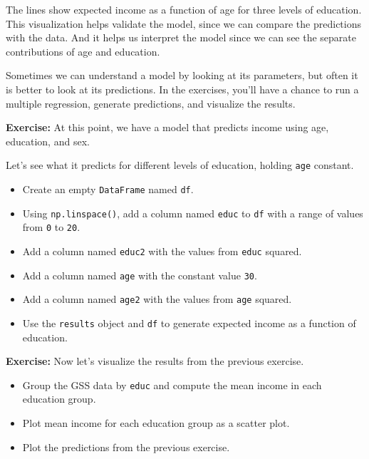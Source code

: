 The lines show expected income as a function of age for three levels of
education. This visualization helps validate the model, since we can
compare the predictions with the data. And it helps us interpret the
model since we can see the separate contributions of age and education.

Sometimes we can understand a model by looking at its parameters, but
often it is better to look at its predictions. In the exercises, you'll
have a chance to run a multiple regression, generate predictions, and
visualize the results.

\textbf{Exercise:} At this point, we have a model that predicts income
using age, education, and sex.

Let's see what it predicts for different levels of education, holding
\passthrough{\lstinline!age!} constant.

\begin{itemize}
\item
  Create an empty \passthrough{\lstinline!DataFrame!} named
  \passthrough{\lstinline!df!}.
\item
  Using \passthrough{\lstinline!np.linspace()!}, add a column named
  \passthrough{\lstinline!educ!} to \passthrough{\lstinline!df!} with a
  range of values from \passthrough{\lstinline!0!} to
  \passthrough{\lstinline!20!}.
\item
  Add a column named \passthrough{\lstinline!educ2!} with the values
  from \passthrough{\lstinline!educ!} squared.
\item
  Add a column named \passthrough{\lstinline!age!} with the constant
  value \passthrough{\lstinline!30!}.
\item
  Add a column named \passthrough{\lstinline!age2!} with the values from
  \passthrough{\lstinline!age!} squared.
\item
  Use the \passthrough{\lstinline!results!} object and
  \passthrough{\lstinline!df!} to generate expected income as a function
  of education.
\end{itemize}

\textbf{Exercise:} Now let's visualize the results from the previous
exercise.

\begin{itemize}
\item
  Group the GSS data by \passthrough{\lstinline!educ!} and compute the
  mean income in each education group.
\item
  Plot mean income for each education group as a scatter plot.
\item
  Plot the predictions from the previous exercise.
\end{itemize}

